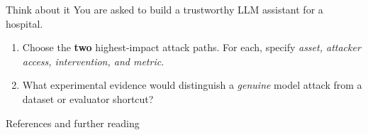 \documentclass[12pt,aspectratio=169,handout]{beamer}
\begin{document}
\begin{frame}{Think about it}
You are asked to build a trustworthy LLM assistant for a hospital.

\vspace{0.6em}
\begin{enumerate}
	\setlength{\itemsep}{0.7em}
	\item Choose the \textbf{two} highest-impact attack paths. For each, specify \emph{asset, attacker access, intervention, and metric}.
	\item What experimental evidence would distinguish a \emph{genuine} model attack from a dataset or evaluator shortcut?
\end{enumerate}
\end{frame}


\renewcommand*{\bibfont}{\scriptsize}
\setlength{\bibitemsep}{0.3em}
\setlength{\bibhang}{1em}
\begin{frame}[allowframebreaks]{References and further reading}
\nocite{*}
\printbibliography[keyword=peerreviewed, heading=rubbib, title={Peer-reviewed research}]
\printbibliography[keyword=preprint, heading=rubbib, title={Preprints \& emerging results}]
\printbibliography[keyword=report, heading=rubbib, title={Incident, vendor \& framework reports}]
\end{frame}
\end{document}
